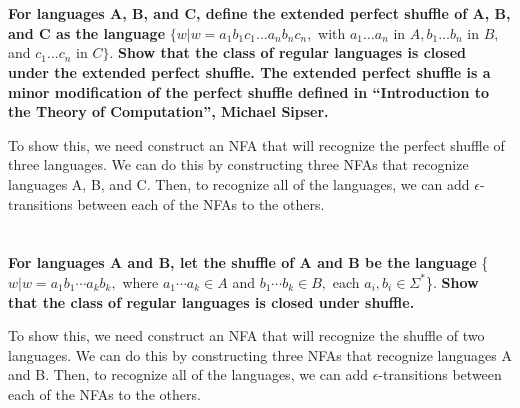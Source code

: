 \documentclass[a4paper,12pt]{article}
\begin{document}
\section{}
\textbf{For languages A, B, and C, define the extended perfect shuffle of A, B, and C as the
language} $\{ w | w = a_1 b_1 c_1 \ldots a_n b_n c_n,$ with $a_1 \ldots a_n$ in $A, b_1 \ldots b_n$ in $B,$ and $c_1 \ldots c_n$ in $C \}$.
\textbf{Show that the class of regular languages is closed under the extended perfect shuffle.
The extended perfect shuffle is a minor modification of the perfect shuffle defined in “Introduction to the Theory of Computation”, Michael Sipser.}

To show this, we need construct an NFA that will recognize the perfect shuffle of three languages.
We can do this by constructing three NFAs that recognize languages A, B, and C.
Then, to recognize all of the languages, we can add $\epsilon$-transitions between each of the NFAs to the others.

\section{}
\textbf{For languages A and B, let the shuffle of A and B be the language}
\{$w| w = a_1 b_1 \cdots a_k b_k,$ where $a_1 \cdots a_k \in A$ and $b_1 \cdots b_k \in B,$ each $a_i , b_i \in \Sigma^* $\}.
\textbf{Show that the class of regular languages is closed under shuffle.}

To show this, we need construct an NFA that will recognize the shuffle of two languages.
We can do this by constructing three NFAs that recognize languages A and B.
Then, to recognize all of the languages, we can add $\epsilon$-transitions between each of the NFAs to the others.
\end{document}
